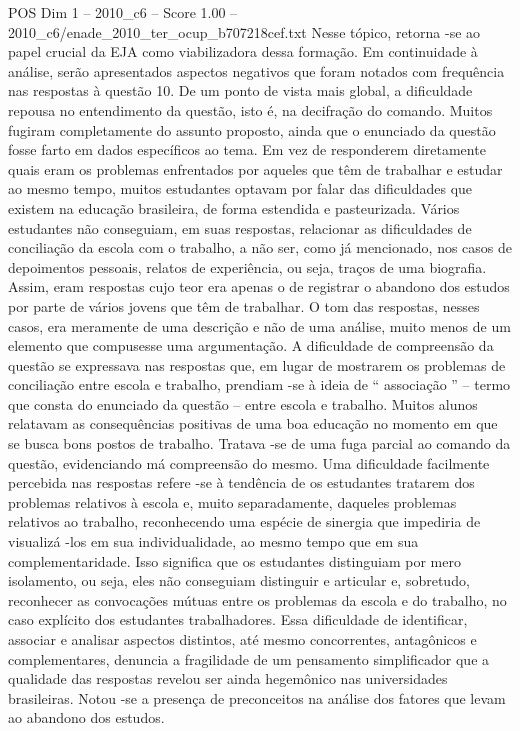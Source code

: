 \begin{textsample}{POS Dim 1 – 2010\_c6 – Score 1.00 – 2010\_c6/enade\_2010\_ter\_ocup\_b707218cef.txt}
Nesse tópico, retorna -se ao papel crucial da EJA como viabilizadora dessa formação.
Em continuidade à análise, serão apresentados aspectos negativos que foram notados com frequência nas respostas à questão 10.
De um ponto de vista mais global, a dificuldade repousa no entendimento da questão, isto é, na decifração do comando.
Muitos fugiram completamente do assunto proposto, ainda que o enunciado da questão fosse farto em dados específicos ao tema.
Em vez de responderem diretamente quais eram os problemas enfrentados por aqueles que têm de trabalhar e estudar ao mesmo tempo, muitos estudantes optavam por falar das dificuldades que existem na educação brasileira, de forma estendida e pasteurizada.
Vários estudantes não conseguiam, em suas respostas, relacionar as dificuldades de conciliação da escola com o trabalho, a não ser, como já mencionado, nos casos de depoimentos pessoais, relatos de experiência, ou seja, traços de uma biografia.
Assim, eram respostas cujo teor era apenas o de registrar o abandono dos estudos por parte de vários jovens que têm de trabalhar.
O tom das respostas, nesses casos, era meramente de uma descrição e não de uma análise, muito menos de um elemento que compusesse uma argumentação.
A dificuldade de compreensão da questão se expressava nas respostas que, em lugar de mostrarem os problemas de conciliação entre escola e trabalho, prendiam -se à ideia de “ associação ” – termo que consta do enunciado da questão – entre escola e trabalho.
Muitos alunos relatavam as consequências positivas de uma boa educação no momento em que se busca bons postos de trabalho.
Tratava -se de uma fuga parcial ao comando da questão, evidenciando má compreensão do mesmo.
Uma dificuldade facilmente percebida nas respostas refere -se à tendência de os estudantes tratarem dos problemas relativos à escola e, muito separadamente, daqueles problemas relativos ao trabalho, reconhecendo uma espécie de sinergia que impediria de visualizá -los em sua individualidade, ao mesmo tempo que em sua complementaridade.
Isso significa que os estudantes distinguiam por mero isolamento, ou seja, eles não conseguiam distinguir e articular e, sobretudo, reconhecer as convocações mútuas entre os problemas da escola e do trabalho, no caso explícito dos estudantes trabalhadores.
Essa dificuldade de identificar, associar e analisar aspectos distintos, até mesmo concorrentes, antagônicos e complementares, denuncia a fragilidade de um pensamento simplificador que a qualidade das respostas revelou ser ainda hegemônico nas universidades brasileiras.
Notou -se a presença de preconceitos na análise dos fatores que levam ao abandono dos estudos.

\end{textsample}
